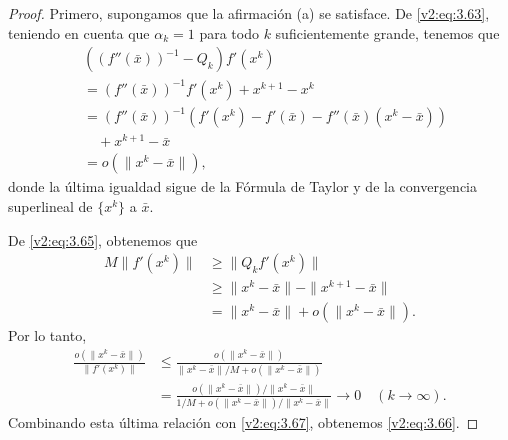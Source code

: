 \begin{proof}
    Primero, supongamos que la afirmación (a) se satisface. De \eqref{v2:eq:3.63}, teniendo en cuenta que $\alpha_k = 1$ para todo $k$ suficientemente grande, tenemos que
    \begin{align}
        &((f''(\bar{x}))^{-1} - Q_k)f'(x^k) \nonumber \\
        &= (f''(\bar{x}))^{-1} f'(x^k) + x^{k+1} - x^k \nonumber \\
        &= (f''(\bar{x}))^{-1} (f'(x^k) - f'(\bar{x}) - f''(\bar{x})(x^k - \bar{x})) \nonumber \\
        &\quad + x^{k+1} - \bar{x} \nonumber \\
        &= o(\|x^k - \bar{x}\|), \label{v2:eq:3.67}
    \end{align}
    donde la última igualdad sigue de la Fórmula de Taylor y de la convergencia superlineal de $\{x^k\}$ a $\bar{x}$.
    
    De \eqref{v2:eq:3.65}, obtenemos que
    \begin{align*}
        M \|f'(x^k)\| &\ge \|Q_k f'(x^k)\| \\
        &\ge \|x^k - \bar{x}\| - \|x^{k+1} - \bar{x}\| \\
        &= \|x^k - \bar{x}\| + o(\|x^k - \bar{x}\|).
    \end{align*}
    Por lo tanto,
    \begin{align*}
        \frac{o(\|x^k - \bar{x}\|)}{\|f'(x^k)\|} &\le \frac{o(\|x^k - \bar{x}\|)}{\|x^k - \bar{x}\| / M + o(\|x^k - \bar{x}\|)} \\
        &= \frac{o(\|x^k - \bar{x}\|)/\|x^k - \bar{x}\|}{1/M + o(\|x^k - \bar{x}\|)/\|x^k - \bar{x}\|} \to 0 \quad (k \to \infty).
    \end{align*}
    Combinando esta última relación con \eqref{v2:eq:3.67}, obtenemos \eqref{v2:eq:3.66}.
    

\end{proof}
